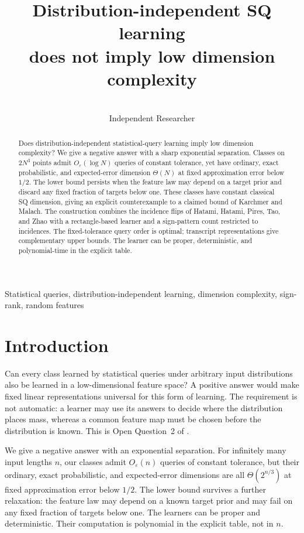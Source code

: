 \documentclass[11pt,letterpaper,pmlr,twoside]{jmlr}
\title[SQ learning and dimension complexity]{Distribution-independent SQ learning\\does not imply low dimension complexity}
\author[Anonymous]{\Name{Anonymous Author}}
\author[Mausberg]{\Name{Samuel Mausberg}\\\addr Independent Researcher}
\newcommand{\eps}{\varepsilon}
\begin{document}
\maketitle
\begin{abstract}
Does distribution-independent statistical-query learning imply low dimension complexity? We give a negative answer with a sharp exponential separation. Classes on $2N^3$ points admit $O_\eps(\log N)$ queries of constant tolerance, yet have ordinary, exact probabilistic, and expected-error dimension $\Theta(N)$ at fixed approximation error below $1/2$. The lower bound persists when the feature law may depend on a target prior and discard any fixed fraction of targets below one. These classes have constant classical SQ dimension, giving an explicit counterexample to a claimed bound of Karchmer and Malach. The construction combines the incidence flips of Hatami, Hatami, Pires, Tao, and Zhao with a rectangle-based learner and a sign-pattern count restricted to incidences. The fixed-tolerance query order is optimal; transcript representations give complementary upper bounds. The learner can be proper, deterministic, and polynomial-time in the explicit table.
\end{abstract}
\begin{keywords}
Statistical queries, distribution-independent learning, dimension complexity, sign-rank, random features
\end{keywords}

\section{Introduction}\label{sec:intro}
Can every class learned by statistical queries under arbitrary input distributions also be learned in a low-dimensional feature space? A positive answer would make fixed linear representations universal for this form of learning. The requirement is not automatic: a learner may use its answers to decide where the distribution places mass, whereas a common feature map must be chosen before the distribution is known. This is Open Question~2 of \citet{FKS26}.

We give a negative answer with an exponential separation. For infinitely many input lengths $n$, our classes admit $O_\eps(n)$ queries of constant tolerance, but their ordinary, exact probabilistic, and expected-error dimensions are all $\Theta(2^{n/3})$ at fixed approximation error below $1/2$. The lower bound survives a further relaxation: the feature law may depend on a known target prior and may fail on any fixed fraction of targets below one. The learners can be proper and deterministic. Their computation is polynomial in the explicit table, not in $n$.
\end{document}
